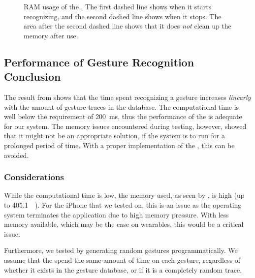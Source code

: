 \begin{figure}[!htb]
  \caption{RAM usage of the \threedollar. The first dashed line shows when it starts recognizing, and the second dashed line shows when it stops. The area after the second dashed line shows that it does \emph{not} clean up the memory after use.}
  \label{fig:threedollarmemory}
\end{figure}

\subsection{Performance of Gesture Recognition Conclusion}
The result from  shows that the time spent recognizing a gesture 
increases \emph{linearly} with the amount of gesture traces in the database.
The computational time is well below the requirement of \SI{200}{\milli\second},
thus the performance of the \threedollar is adequate for our system. 
The memory issues encountered during testing, however, 
showed that it might not be an appropriate solution, 
if the system is to run for a prolonged period of time.
With a proper implementation of the \threedollar, 
this can be avoided. 

\subsubsection{Considerations}
While the computational time is low, 
the memory used, as seen by , is high (up to \SI{405.1}{\mega\byte}). 
For the iPhone that we tested on, this is an issue as the operating system terminates the application due to high memory pressure. 
With less memory available, which may be the case on wearables,
this would be a critical issue.

Furthermore, we tested by generating random gestures programmatically. 
We assume that the \threedollar spend the same amount of time on each gesture, 
regardless of whether it exists in the gesture database, 
or if it is a completely random trace. 

